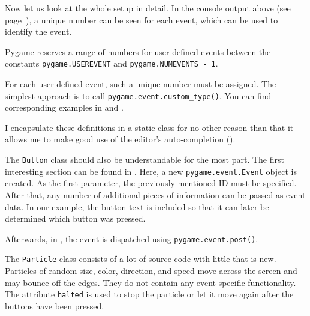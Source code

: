 Now let us look at the whole setup in detail. In the console output above (see page~\pageref{srcConsole00a}), a unique number can be seen for each event, which can be used to identify the event. 

\begin{hintbox}
	Pygame reserves a range of numbers for user-defined events between the constants \texttt{pygame.USEREVENT} and \texttt{pygame.NUMEVENTS~-~1}. 
\end{hintbox}
For each user-defined event, such a unique number must be assigned. The simplest approach is to call \texttt{pygame.event.custom\_type()}. You can find corresponding examples in  and .

I encapsulate these definitions in a static class for no other reason than that it allows me to make good use of the editor’s auto-completion (). 


The \texttt{Button} class should also be understandable for the most part. The first interesting section can be found in . Here, a new \texttt{pygame.event.Event} object is created. As the first parameter, the previously mentioned ID must be specified. After that, any number of additional pieces of information can be passed as event data. In our example, the button text is included so that it can later be determined which button was pressed.

Afterwards, in , the event is dispatched using \texttt{pygame.event.post()}.


The \texttt{Particle} class consists of a lot of source code with little that is new. Particles of random size, color, direction, and speed move across the screen and may bounce off the edges. They do not contain any event-specific functionality. The attribute \texttt{halted} is used to stop the particle or let it move again after the buttons have been pressed.


